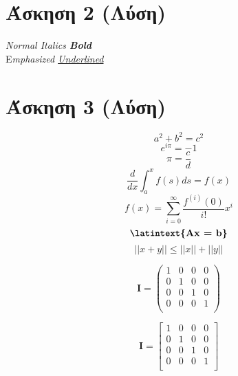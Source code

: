 \documentclass[a4paper,11pt]{article}
\newcommand{\lt}{\latintext}
\begin{document}
\vspace{20pt}

\section{Άσκηση 2 (Λύση)}

	\begin{center}	
		\lt
		\textit{Normal Italics \textbf{Bold\\}}
		{E}\textit{mphasized \underline{Underlined}}
	\end{center}

\section{Άσκηση 3 (Λύση)}
	
	\begin{equation*}
	a^2 + b^2 = c^2
	\end{equation*}
	\begin{equation*}
	e^{i\pi} = -1
	\end{equation*}
	\begin{equation*}
	\pi = \frac{c}{d}
	\end{equation*}
	\begin{equation*}
	\dfrac{d}{dx}\int_{a}^{x} f(s) ds = f(x)
	\end{equation*}
	\begin{equation*}
	f(x) = \sum_{i=0}^{\infty } {\dfrac{f^{(i)}(0)}{i!} x^i }
	\end{equation*}
	\begin{equation*}
	\textbf{\lt{Ax = b}}
	\end{equation*}
	\begin{equation*}
	||{x+y}||\leq||x||+||y||
	\end{equation*}
	
	\quad
	
	\begin{equation}
	\textbf{I} = 
	\begin{pmatrix}
	1&0&0&0 \\
	0&1&0&0 \\
	0&0&1&0 \\
	0&0&0&1 \\
	\end{pmatrix}
	\end{equation}
	
	\quad
	
	\begin{equation}
	\textbf{I} = 
	\begin{bmatrix}
	1&0&0&0 \\
	0&1&0&0 \\
	0&0&1&0 \\
	0&0&0&1 \\
	\end{bmatrix}
	\end{equation}
	
\end{document}
